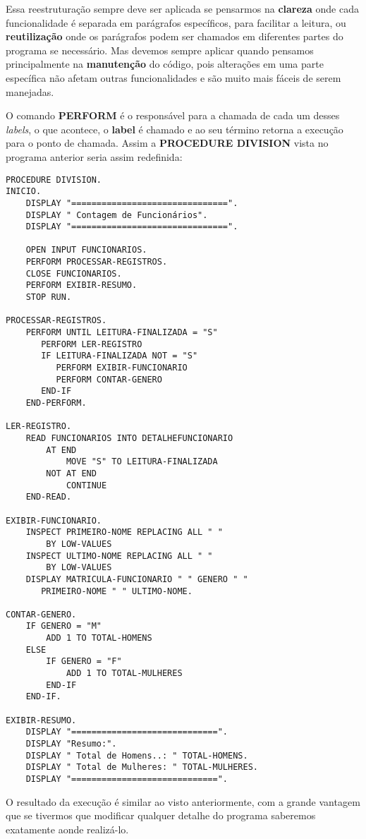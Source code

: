 Essa reestruturação sempre deve ser aplicada se pensarmos na \textbf{clareza} onde cada funcionalidade é separada em parágrafos específicos, para facilitar a leitura, ou \textbf{reutilização} onde os parágrafos podem ser chamados em diferentes partes do programa se necessário. Mas devemos sempre aplicar quando pensamos principalmente na \textbf{manutenção} do código, pois alterações em uma parte específica não afetam outras funcionalidades e são muito mais fáceis de serem manejadas.

O comando \textbf{PERFORM} é o responsável para a chamada de cada um desses \textit{labels}, o que acontece, o \textbf{label} é chamado e ao seu término retorna a execução para o ponto de chamada. Assim a \textbf{PROCEDURE DIVISION} vista no programa anterior seria assim redefinida:

\begin{lstlisting}[]
PROCEDURE DIVISION.
INICIO.
    DISPLAY "===============================".
    DISPLAY " Contagem de Funcionários".
    DISPLAY "===============================".

    OPEN INPUT FUNCIONARIOS.
    PERFORM PROCESSAR-REGISTROS.
    CLOSE FUNCIONARIOS.
    PERFORM EXIBIR-RESUMO.
    STOP RUN.

PROCESSAR-REGISTROS.
    PERFORM UNTIL LEITURA-FINALIZADA = "S"
       PERFORM LER-REGISTRO
       IF LEITURA-FINALIZADA NOT = "S"
          PERFORM EXIBIR-FUNCIONARIO
          PERFORM CONTAR-GENERO
       END-IF
    END-PERFORM.    

LER-REGISTRO. 
    READ FUNCIONARIOS INTO DETALHEFUNCIONARIO
        AT END
            MOVE "S" TO LEITURA-FINALIZADA
        NOT AT END
            CONTINUE
    END-READ.

EXIBIR-FUNCIONARIO.
    INSPECT PRIMEIRO-NOME REPLACING ALL " " 
        BY LOW-VALUES
    INSPECT ULTIMO-NOME REPLACING ALL " " 
        BY LOW-VALUES
    DISPLAY MATRICULA-FUNCIONARIO " " GENERO " "
       PRIMEIRO-NOME " " ULTIMO-NOME. 

CONTAR-GENERO.
    IF GENERO = "M"
        ADD 1 TO TOTAL-HOMENS
    ELSE
        IF GENERO = "F"
            ADD 1 TO TOTAL-MULHERES
        END-IF
    END-IF.

EXIBIR-RESUMO.
    DISPLAY "=============================".
    DISPLAY "Resumo:".
    DISPLAY " Total de Homens..: " TOTAL-HOMENS.
    DISPLAY " Total de Mulheres: " TOTAL-MULHERES.
    DISPLAY "=============================".
\end{lstlisting}

O resultado da execução é similar ao visto anteriormente, com a grande vantagem que se tivermos que modificar qualquer detalhe do programa saberemos exatamente aonde realizá-lo.

